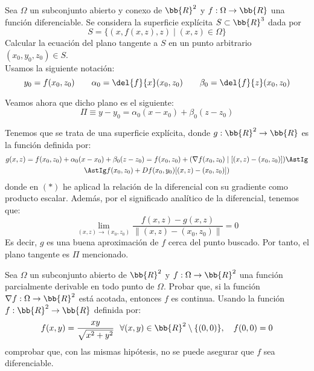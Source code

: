\begin{ejercicio}
    Sea $\Omega$ un subconjunto abierto y conexo de $\bb{R}^2$ y $f:\Omega\to \bb{R}$ una función diferenciable. Se considera la superficie explícita $S\subset \bb{R}^3$ dada por
    \begin{equation*}
        S=\{(x,f(x,z), z)\mid (x,z)\in \Omega\}
    \end{equation*}
    Calcular la ecuación del plano tangente a $S$ en un punto arbitrario $(x_0,y_0,z_0)\in S$.\\

    Usamos la siguiente notación:
    \begin{equation*}
        y_0=f(x_0,z_0) \qquad \alpha_0 = \del{f}{x}(x_0, z_0) \qquad \beta_0 = \del{f}{z}(x_0, z_0)
    \end{equation*}

    Veamos ahora que dicho plano es el siguiente:
    \begin{equation*}
        \Pi \equiv y-y_0 = \alpha_0(x-x_0) + \beta_0(z-z_0)
    \end{equation*}

    Tenemos que se trata de una superficie explícita, donde $g:\bb{R}^2\to \bb{R}$ es la función definida por:
    \begin{multline*}
        g(x,z) = f(x_0,z_0) + \alpha_0(x-x_0) + \beta_0(z-z_0) = f(x_0,z_0) + (\nabla f(x_0,z_0)\mid [(x,z) - (x_0,z_0)]) \AstIg\\
        \AstIg f(x_0,z_0) + Df(x_0,y_0)[(x,z) - (x_0,z_0)])
    \end{multline*}
    donde en $(\ast)$ he aplicad la relación de la diferencial con su gradiente como producto escalar. Además, por el significado analítico de la diferencial, tenemos que:
    \begin{equation*}
        \lim_{(x,z)\to (x_0,z_0)} \frac{f(x,z) - g(x,z)}{\|(x,z)-(x_0,z_0)\|} = 0
    \end{equation*}
    Es decir, $g$ es una buena aproximación de $f$ cerca del punto buscado. Por tanto, el plano tangente es $\Pi$ mencionado.
\end{ejercicio}


\begin{ejercicio}
    Sea $\Omega$ un subconjunto abierto de $\bb{R}^2$ y $f:\Omega\to \bb{R}^2$ una función parcialmente derivable en todo punto de $\Omega$. Probar que, si la función $\nabla f :\Omega\to \bb{R}^2$ está acotada, entonces $f$ es continua. Usando la función $f:\bb{R}^2\to \bb{R}$ definida por:
    \begin{equation*}
        f(x,y) = \frac{xy}{\sqrt{x^2+y^2}}~~\forall (x,y)\in \bb{R}^2\setminus \{(0,0)\}, \quad f(0,0)=0
    \end{equation*}
    comprobar que, con las mismas hipótesis, no se puede asegurar que $f$ sea diferenciable.\\
\end{ejercicio}